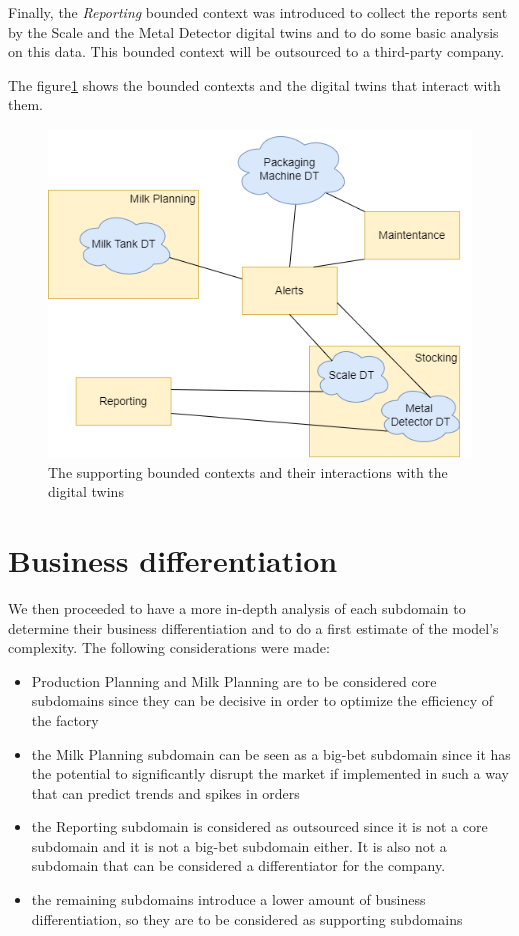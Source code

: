 Finally, the \textit{Reporting} bounded context was introduced to collect the reports sent by the Scale and the Metal Detector digital twins and to do some basic analysis on this data. This bounded context will be outsourced to a third-party company.

The figure\ref{img:subdomains-dt} shows the bounded contexts and the digital twins that interact with them.

\begin{figure}[H]
    \centering
    \includegraphics[width=\textwidth]{img/subdomains-dt.png}
    \caption{The supporting bounded contexts and their interactions with the digital twins}
    \label{img:subdomains-dt}
\end{figure}

\section{Business differentiation}
We then proceeded to have a more in-depth analysis of each subdomain to determine their business differentiation and to do a first estimate of the model's complexity. The following considerations were made:
\begin{itemize}
    \item Production Planning and Milk Planning are to be considered core subdomains since they can be decisive in order to optimize the efficiency of the factory
    \item the Milk Planning subdomain can be seen as a big-bet subdomain since it has the potential to significantly disrupt the market if implemented in such a way that can predict trends and spikes in orders
    \item the Reporting subdomain is considered as outsourced since it is not a core subdomain and it is not a big-bet subdomain either. It is also not a subdomain that can be considered a differentiator for the company.
    \item the remaining subdomains introduce a lower amount of business differentiation, so they are to be considered as supporting subdomains
\end{itemize}

